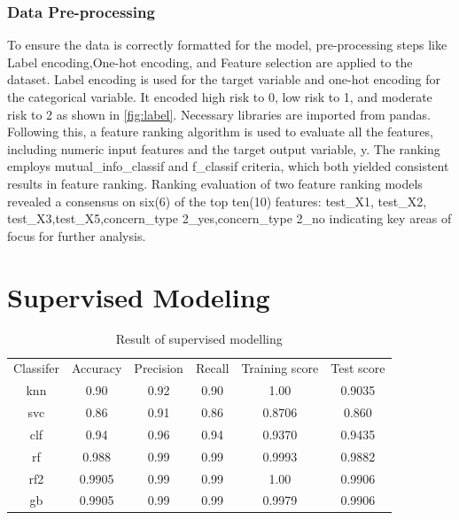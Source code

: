 \documentclass[a4paper]{article}
\begin{document}
\subsubsection{Data Pre-processing}
To ensure the data is correctly formatted for the model, pre-processing steps like Label encoding,One-hot encoding, and Feature selection are applied to the dataset. Label encoding is used for the target variable and one-hot encoding for the categorical variable. It encoded high risk to 0, low risk to 1, and moderate risk to 2 as shown in \ref{fig:label}. Necessary libraries are imported from pandas. Following this, a feature ranking algorithm is used to evaluate all the features, including numeric input features and the target output variable, y. The ranking employs mutual\_info\_classif and f\_classif criteria, which both yielded consistent results in feature ranking. Ranking evaluation of two feature ranking models revealed a consensus on six(6) of the top ten(10) features: test\_X1, test\_X2, test\_X3,test\_X5,concern\_type 2\_yes,concern\_type 2\_no indicating key areas of focus for further analysis.
\section{Supervised Modeling}

\begin{table}
    \centering
    \begin{tabular}{cccccc}
        Classifer & Accuracy & Precision  & Recall  & Training score  & Test score \\
        knn & 0.90 & 0.92  & 0.90  & 1.00  & 0.9035 \\
        svc & 0.86 & 0.91 & 0.86  & 0.8706 & 0.860 \\
         clf & 0.94 & 0.96 & 0.94 & 0.9370 &  0.9435\\
        rf & 0.988 & 0.99 & 0.99 & 0.9993 & 0.9882 \\
        rf2 & 0.9905 & 0.99 & 0.99  & 1.00  &  0.9906\\
        gb & 0.9905 & 0.99 & 0.99 & 0.9979 & 0.9906 \\
    \end{tabular}
    \caption{Result of supervised modelling}
    \label{tab:my_label}
\end{table}
\end{document}
